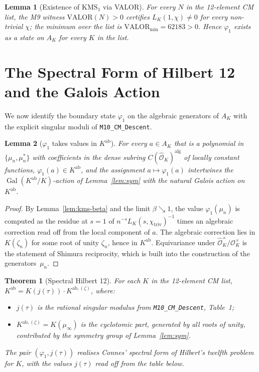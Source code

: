 \documentclass[11pt]{article}
\newtheorem{theorem}{Theorem}
\newtheorem{lemma}{Lemma}[section]
\newcommand{\Oh}{\mathcal{O}}
\newcommand{\Ohh}{\widehat{\Oh}}
\newcommand{\Gal}{\operatorname{Gal}}
\newcommand{\ab}{\mathrm{ab}}
\begin{document}
\begin{lemma}[Existence of $\mathrm{KMS}_1$ via VALOR]\label{lem:valor}
For every $N$ in the 12-element CM list, the M9 witness
$\mathrm{VALOR}(N) > 0$ certifies $L_K(1, \chi) \neq 0$ for every
non-trivial $\chi$; the minimum over the list is
$\mathrm{VALOR}_{\min} = 62183 > 0$. Hence
$\varphi_1$ exists as a state on $A_K$ for every $K$ in the list.
\end{lemma}

\section{The Spectral Form of Hilbert 12 and the Galois Action}
\label{sec:h12}

We now identify the boundary state $\varphi_1$ on the algebraic
generators of $A_K$ with the explicit singular moduli of
\texttt{M10\_CM\_Descent}.

\begin{lemma}[$\varphi_1$ takes values in $K^{\ab}$]\label{lem:h12-spectral}
For every $a \in A_K$ that is a polynomial in
$\{\mu_n, \mu_n^{*}\}$ with coefficients in the dense subring
$C(\Ohh_K)^{\mathrm{alg}}$ of locally constant functions,
$\varphi_1(a) \in K^{\ab}$, and the assignment
$a \mapsto \varphi_1(a)$ intertwines the $\Gal(K^{\ab}/K)$-action of
Lemma~\ref{lem:sym} with the natural Galois action on $K^{\ab}$.
\end{lemma}

\begin{proof}
By Lemma~\ref{lem:kms-beta} and the limit $\beta \searrow 1$, the
value $\varphi_1(\mu_n)$ is computed as the residue at $s = 1$ of
$n^{-s} L_K(s, \chi_{\mathrm{triv}})^{-1}$ times an algebraic
correction read off from the local component of $a$. The algebraic
correction lies in $K(\zeta_n)$ for some root of unity $\zeta_n$, hence
in $K^{\ab}$. Equivariance under
$\Ohh_K^{\times}/\Oh_K^{\times}$ is the statement of Shimura
reciprocity, which is built into the construction of the
generators~$\mu_n$.
\end{proof}

\begin{theorem}[Spectral Hilbert 12]\label{thm:h12}
For each $K$ in the 12-element CM list,
$K^{\ab} = K(j(\tau)) \cdot K^{\ab,(\zeta)}$, where:
\begin{itemize}
  \item $j(\tau)$ is the rational singular modulus from
        \texttt{M10\_CM\_Descent}, Table~1;
  \item $K^{\ab,(\zeta)} = K(\mu_{\infty})$ is the cyclotomic part,
        generated by all roots of unity, contributed by the symmetry
        group of Lemma~\ref{lem:sym}.
\end{itemize}
The pair $(\varphi_1, j(\tau))$ realises Connes' spectral form of
Hilbert's twelfth problem for $K$, with the values $j(\tau)$ read off
from the table below.
\end{theorem}
\end{document}

